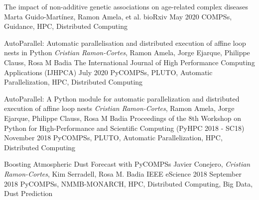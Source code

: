 \begin{publications}
    \publication
        {The impact of non-additive genetic associations on age-related complex diseases}
        {Marta Guido-Martínez, Ramon Amela, et al.}
        {bioRxiv}
        {May 2020}
        {COMPSs, Guidance, HPC, Distributed Computing}
        {}

    \publication
        {AutoParallel: Automatic parallelisation and distributed execution of affine loop nests in Python}
        {\textit{Cristian Ramon-Cortes}, Ramon Amela, Jorge Ejarque, Philippe Clauss, Rosa M Badia}
        {The International Journal of High Performance Computing Applications (IJHPCA)}
        {July 2020}
        {PyCOMPSs, PLUTO, Automatic Parallelization, HPC, Distributed Computing}
        {}
    
    \publication
        {AutoParallel: A Python module for automatic parallelization and distributed execution of affine loop nests}
        {\textit{Cristian Ramon-Cortes}, Ramon Amela, Jorge Ejarque, Philippe Clauss, Rosa M Badia}
        {Proceedings of the 8th Workshop on Python for High-Performance and Scientific Computing (PyHPC 2018 - SC18)}
        {November 2018}
        {PyCOMPSs, PLUTO, Automatic Parallelization, HPC, Distributed Computing}
        {}
        
    \publication
        {Boosting Atmospheric Dust Forecast with PyCOMPSs}
        {Javier Conejero, \textit{Cristian Ramon-Cortes}, Kim Serradell, Rosa M. Badia}
        {IEEE eScience 2018}
        {September 2018}
        {PyCOMPSs, NMMB-MONARCH, HPC, Distributed Computing, Big Data, Dust Prediction}
        {}
\end{publications}

